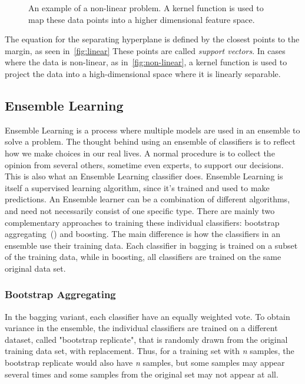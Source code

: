 \begin{figure}[ht]
\begin{minipage}[b]{0.45\linewidth}
		\caption[An example of a non-linear SVM problem.]{An example of a non-linear problem. A kernel function is used to map these data points into a higher dimensional feature space.}
		\label{fig:non-linear}
	\end{minipage}
\end{figure}

The equation for the separating hyperplane is defined by the closest points to the margin, as seen in~\autoref{fig:linear} These points are called \emph{support vectors}. In cases where the data is non-linear, as in~\autoref{fig:non-linear}, a kernel function is used to project the data into a high-dimensional space where it is linearly separable.

\subsection{Ensemble Learning}

Ensemble Learning is a process where multiple models are used in an ensemble to solve a problem. The thought behind using an ensemble of classifiers is to reflect how we make choices in our real lives. A normal procedure is to collect the opinion from several others, sometime even experts, to support our decisions. This is also what an Ensemble Learning classifier does. Ensemble Learning is itself a supervised learning algorithm, since it's trained and used to make predictions. An Ensemble learner can be a combination of different algorithms, and need not necessarily consist of one specific type. There are mainly two complementary approaches to training these individual classifiers: bootstrap aggregating~() and boosting. The main difference is how the classifiers in an ensemble use their training data. Each classifier in bagging is trained on a subset of the training data, while in boosting, all classifiers are trained on the same original data set.

\subsubsection{Bootstrap Aggregating}

In the bagging variant, each classifier have an equally weighted vote. To obtain variance in the ensemble, the individual classifiers are trained on a different dataset, called "bootstrap replicate", that is randomly drawn from the original training data set, with replacement. Thus, for a training set with \emph{n} samples, the bootstrap replicate would also have \emph{n} samples, but some samples may appear several times and some samples from the original set may not appear at all.

